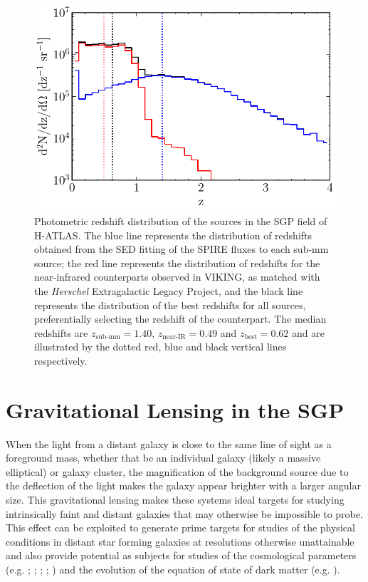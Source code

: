 \begin{figure}
    \centering
    \includegraphics[width=\columnwidth]{Figures/redshift_distribution.pdf}
    \caption{Photometric redshift distribution of the sources in the SGP field of H-ATLAS. The blue line represents the distribution of redshifts obtained from the SED fitting of the SPIRE fluxes to each sub-mm source; the red line represents the distribution of redshifts for the near-infrared counterparts observed in VIKING, as matched with the \textit{Herschel} Extragalactic Legacy Project, and the black line represents the distribution of the best redshifts for all sources, preferentially selecting the redshift of the counterpart. The median redshifts are $z_{\textrm{sub-mm}} = 1.40$, $z_{\textrm{near-IR}} = 0.49$ and $z_{\textrm{best}} = 0.62$ and are illustrated by the dotted red, blue and black vertical lines respectively.}
    \label{fig:redshift_distribution}
\end{figure}

\section{Gravitational Lensing in the SGP}

When the light from a distant galaxy is close to the same line of sight as a foreground mass, whether that be an individual galaxy (likely a massive elliptical) or galaxy cluster, the magnification of the background source due to the deflection of the light makes the galaxy appear brighter with a larger angular size. This gravitational lensing makes these systems ideal targets for studying intrinsically faint and distant galaxies that may otherwise be impossible to probe. This effect can be exploited to generate prime targets for studies of the physical conditions in distant star forming galaxies at resolutions otherwise unattainable and also provide potential as subjects for studies of the cosmological parameters (e.g. \citealt{Kochanek_1992}; \citealt{Kochanek_1996}; \citealt{Grillo_2008}; \citealt{Oguri_2012}; \citealt{Eales_2015}) and the evolution of the equation of state of dark matter (e.g. \citealt{Zhang_2009}). 


